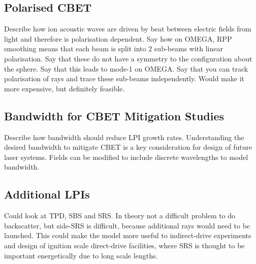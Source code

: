 \subsection{Polarised CBET}

Describe how ion acoustic waves are driven by beat between electric fields from light and therefore is polarisation dependent.
Say how on OMEGA, RPP smoothing means that each beam is split into 2 sub-beams with linear polarisation.
Say that these do not have a symmetry to the configuration about the sphere.
Say that this leads to mode-1 on OMEGA.
Say that you can track polarisation of rays and trace these sub-beams independently.
Would make it more expensive, but definitely feasible.

\subsection{Bandwidth for CBET Mitigation Studies}

Describe how bandwidth should reduce LPI growth rates.
Understanding the desired bandwidth to mitigate CBET is a key consideration for design of future laser systems.
Fields can be modified to include discrete wavelengths to model bandwidth.

\subsection{Additional LPIs}

Could look at TPD, SBS and SRS.
In theory not a difficult problem to do backscatter, but side-SRS is difficult, because additional rays would need to be launched.
This could make the model more useful to indirect-drive experiments and design of ignition scale direct-drive facilities, where SRS is thought to be important energetically due to long scale lengths.

\fi


